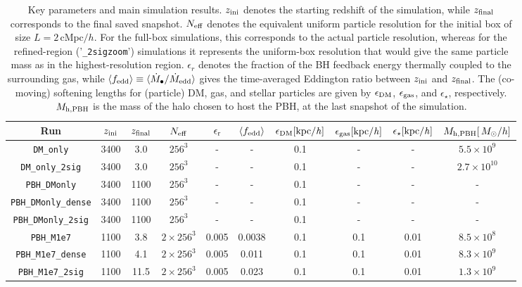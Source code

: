 \documentclass[twocolumn,trackchanges]{aastex701}
\begin{document}
\begin{table}[htb!]
    \centering
    \caption{Key parameters and main simulation results.
    $z_{\rm ini}$ denotes the starting redshift of the simulation, while $z_{\rm final}$ corresponds to the final saved snapshot. $N_{\rm eff}$ denotes the equivalent uniform particle resolution for the initial box of size $L=2\,\mathrm{cMpc}/h$. For the full-box simulations, this corresponds to the actual particle resolution, whereas for the refined-region ('\texttt{\_2sigzoom}') simulations it represents the uniform-box resolution that would give the same particle mass as in the highest-resolution region.
$\epsilon_r$ denotes the fraction of the BH feedback energy thermally coupled to the surrounding gas, while
$\langle f_{\rm edd}\rangle \equiv \langle \dot{M}_{\bullet}/\dot{M}_{\rm edd}\rangle$ gives the time-averaged Eddington ratio between $z_{\rm ini}$ and $z_{\rm final}$. The (co-moving) softening lengths for (particle) DM, gas, and stellar particles are given by $\epsilon_{\rm DM}$, $\epsilon_{\rm gas}$, and $\epsilon_{\star}$, respectively. $M_{\rm h, PBH}$ is the mass of the halo chosen to host the PBH, at the last snapshot of the simulation. }
    \begin{tabular}{cccccccccc}
    \hline
        Run &$z_{\rm ini}$  & $z_{\rm final}$& $N_{\rm eff}$  & $\epsilon_{\rm r}$ &$\langle f_{\rm edd}\rangle$  & $\epsilon_{\rm DM}\small[\rm kpc/\it h]$& $\epsilon_{\rm gas}\small[\rm kpc/\it h]$ & $\epsilon_{\star}\small[\rm kpc/\it h]$ & $M_{\rm h, PBH}\small[\,M_{\odot}/h]$\\

    \hline
    
    \texttt{DM\_only}   & 3400  & 3.0 & $ 256^3$  & -& - & 0.1  & - & - & $5.5 \times 10^9$ \\\texttt{DM\_only\_2sig}   & 3400  & 3.0 & $ 256^3$  & -& - & 0.1  & - & - & $2.7 \times 10^{10}$ \\
    \texttt{PBH\_DMonly}   & 3400  & 1100 & $ 256^3$  & -& - & 0.1  & - & - & -  \\
    \texttt{PBH\_DMonly\_dense}   & 3400  & 1100 & $ 256^3$  & -& - & 0.1  & - & -  & - \\
    \texttt{PBH\_DMonly\_2sig}   & 3400  & 1100 & $ 256^3$  & -& - & 0.1  & - & -  & - \\
    \texttt{PBH\_M1e7}   & 1100 & 3.8 &  $2\times 256^3$  &  0.005 & 0.0038& 0.1 & 0.1 & 0.01 & $8.5 \times 10^8$ \\
    \texttt{PBH\_M1e7\_dense}   & 1100 & 4.1 &  $2\times 256^3$  &  0.005 & 0.011 & 0.1 & 0.1 & 0.01 & $8.3\times 10^9$ \\\texttt{PBH\_M1e7\_2sig}   & 1100 & 11.5 &  $2\times 256^3$  &  0.005 & 0.023 & 0.1 & 0.1 & 0.01 & $1.3\times 10^9$ \\


\end{tabular}
\end{table}
\end{document}
